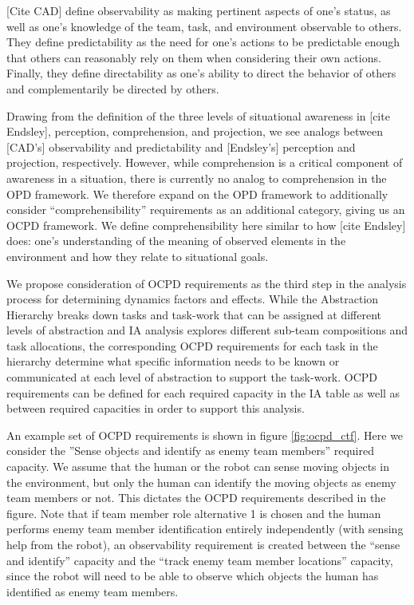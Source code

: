 \documentclass[letterpaper, 10 pt, conference]{ieeeconf}  %
\theoremstyle{definition}
\begin{document}
[Cite CAD] define observability as making pertinent aspects of one’s status, as well as one’s knowledge of the team, task, and environment observable to others. They define predictability as the need for one’s actions to be predictable enough that others can reasonably rely on them when considering their own actions. Finally, they define directability as one’s ability to direct the behavior of others and complementarily be directed by others. 

Drawing from the definition of the three levels of situational awareness in [cite Endsley], perception, comprehension, and projection, we see analogs between [CAD's] observability and predictability and [Endsley's] perception and projection, respectively. However, while comprehension is a critical component of awareness in a situation, there is currently no analog to comprehension in the OPD framework. We therefore expand on the OPD framework to additionally consider ``comprehensibility'' requirements as an additional category, giving us an OCPD framework. We define comprehensibility here similar to how [cite Endsley] does: one's understanding of the meaning of observed elements in the environment and how they relate to situational goals. 

We propose consideration of OCPD requirements as the third step in the analysis process for determining dynamics factors and effects. While the Abstraction Hierarchy breaks down tasks and task-work that can be assigned at different levels of abstraction and IA analysis explores different sub-team compositions and task allocations, the corresponding OCPD requirements for each task in the hierarchy determine what specific information needs to be known or communicated at each level of abstraction to support the task-work. OCPD requirements can be defined for each required capacity in the IA table as well as between required capacities in order to support this analysis. %

An example set of OCPD requirements is shown in figure \ref{fig:ocpd_ctf}. Here we consider the ''Sense objects and identify as enemy team members'' required capacity. We assume that the human or the robot can sense moving objects in the environment, but only the human can identify the moving objects as enemy team members or not. This dictates the OCPD requirements described in the figure. Note that if team member role alternative 1 is chosen and the human performs enemy team member identification entirely independently (with sensing help from the robot), an observability requirement is created between the ``sense and identify'' capacity and the ``track enemy team member locations'' capacity, since the robot will need to be able to observe which objects the human has identified as enemy team members. 
\end{document}
